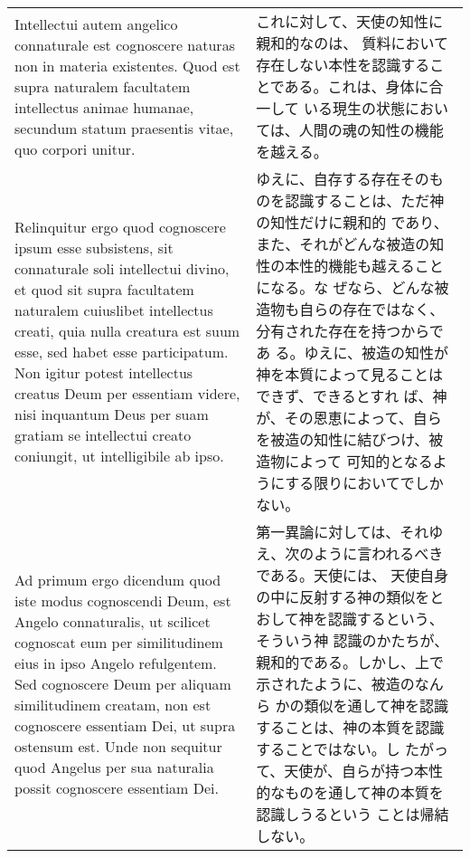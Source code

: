 \documentclass[10pt]{jsarticle} %
\begin{document}
\begin{longtable}{p{21em}p{21em}}
\\

Intellectui autem angelico
connaturale est cognoscere naturas non in materia existentes. Quod est
supra naturalem facultatem intellectus animae humanae, secundum statum
praesentis vitae, quo corpori unitur.

&

これに対して、天使の知性に親和的なのは、
質料において存在しない本性を認識することである。これは、身体に合一して
いる現生の状態においては、人間の魂の知性の機能を越える。

\\

Relinquitur ergo quod cognoscere ipsum esse subsistens, sit
connaturale soli intellectui divino, et quod sit supra facultatem
naturalem cuiuslibet intellectus creati, quia nulla creatura est suum
esse, sed habet esse participatum. Non igitur potest intellectus
creatus Deum per essentiam videre, nisi inquantum Deus per suam
gratiam se intellectui creato coniungit, ut intelligibile ab ipso.

&

ゆえに、自存する存在そのものを認識することは、ただ神の知性だけに親和的
であり、また、それがどんな被造の知性の本性的機能も越えることになる。な
ぜなら、どんな被造物も自らの存在ではなく、分有された存在を持つからであ
る。ゆえに、被造の知性が神を本質によって見ることはできず、できるとすれ
ば、神が、その恩恵によって、自らを被造の知性に結びつけ、被造物によって
可知的となるようにする限りにおいてでしかない。

\\

{\sc Ad primum ergo dicendum} quod iste modus cognoscendi Deum, est
Angelo connaturalis, ut scilicet cognoscat eum per similitudinem eius
in ipso Angelo refulgentem. Sed cognoscere Deum per aliquam
similitudinem creatam, non est cognoscere essentiam Dei, ut supra
ostensum est. Unde non sequitur quod Angelus per sua naturalia possit
cognoscere essentiam Dei.

&

第一異論に対しては、それゆえ、次のように言われるべきである。天使には、
天使自身の中に反射する神の類似をとおして神を認識するという、そういう神
認識のかたちが、親和的である。しかし、上で示されたように、被造のなんら
かの類似を通して神を認識することは、神の本質を認識することではない。し
たがって、天使が、自らが持つ本性的なものを通して神の本質を認識しうるという
ことは帰結しない。

\\


\end{longtable}
\end{document}
